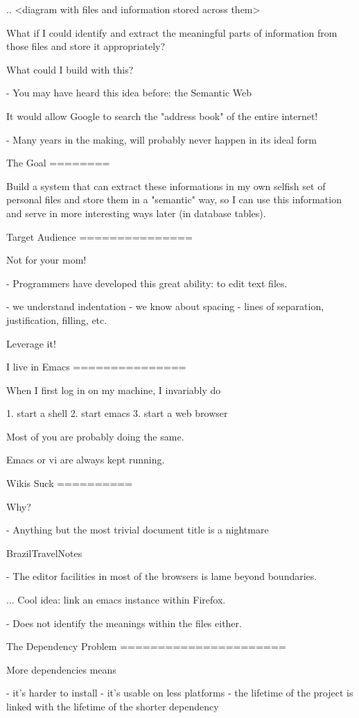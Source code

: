 .. <diagram with files and information stored across them>

What if I could identify and extract the meaningful parts of information from
those files and store it appropriately?

What could I build with this?

- You may have heard this idea before: the Semantic Web

  It would allow Google to search the "address book" of the entire internet!

- Many years in the making, will probably never happen in its ideal form


The Goal
========

  Build a system that can extract these informations in my own selfish set of
  personal files and store them in a "semantic" way, so I can use this
  information and serve in more interesting ways later (in database tables).


Target Audience
===============

Not for your mom!

- Programmers have developed this great ability: to edit text files.

  - we understand indentation
  - we know about spacing
  - lines of separation, justification, filling, etc.

  Leverage it!


I live in Emacs
===============

When I first log in on my machine, I invariably do

1. start a shell
2. start emacs
3. start a web browser

Most of you are probably doing the same.

Emacs or vi are always kept running.


Wikis Suck
==========

Why?

- Anything but the most trivial document title is a nightmare

  BrazilTravelNotes

- The editor facilities in most of the browsers is lame beyond boundaries.

... Cool idea: link an emacs instance within Firefox.

- Does not identify the meanings within the files either.


The Dependency Problem
======================

More dependencies means

- it's harder to install
- it's usable on less platforms
- the lifetime of the project is linked with the lifetime of the shorter
  dependency 

